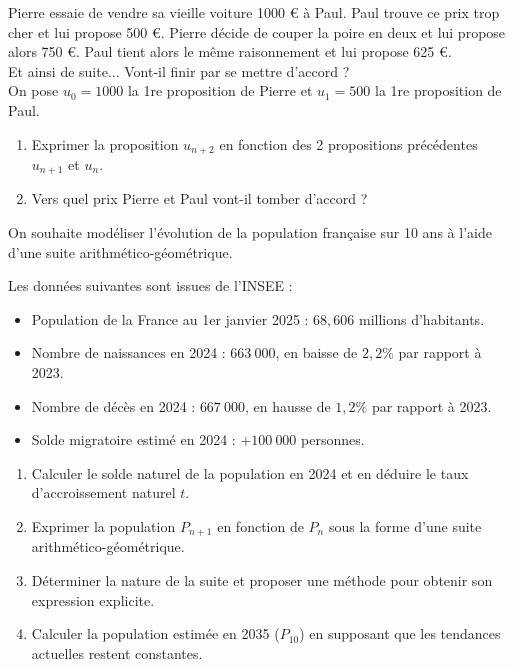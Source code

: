 \documentclass[11pt]{article}
\begin{document}
\begin{exercice}[6][Négociation]
Pierre essaie de vendre sa vieille voiture 1000 € à Paul. Paul trouve
ce prix trop cher et lui propose 500 €. Pierre décide de couper la
poire en deux et lui propose alors 750 €. Paul tient alors le même raisonnement et lui propose 625 €. \\
Et ainsi de suite... Vont-il finir par se mettre d’accord ? \\
On pose $u_0 = 1000$ la 1re proposition de Pierre et $u_1 = 500$ la
1re proposition de Paul.
\begin{enumerate}
\item Exprimer la proposition $u_{n+2}$ en fonction des 2 propositions précédentes $u_{n+1}$ et $u_n$.
\item Vers quel prix Pierre et Paul vont-il tomber d’accord ?
\end{enumerate}
\end{exercice}

\newpage

\begin{exercice}
On souhaite modéliser l'évolution de la population française sur 10
ans à l'aide d'une suite arithmético-géométrique.

Les données suivantes sont issues de l'INSEE :
\begin{itemize}
\item Population de la France au 1er janvier 2025 : $68{,}606$
millions d'habitants.
\item Nombre de naissances en 2024 : $663~000$, en baisse de $2{,}2\%$
par rapport à 2023.
\item Nombre de décès en 2024 : $667~000$, en hausse de $1{,}2\%$ par
rapport à 2023.
\item Solde migratoire estimé en 2024 : $+100~000$ personnes.
\end{itemize}

\begin{enumerate}
\item Calculer le solde naturel de la population en 2024 et en déduire
le taux d'accroissement naturel $t$.
\item Exprimer la population $P_{n+1}$ en fonction de $P_n$ sous la
forme d'une suite arithmético-géométrique.
\item Déterminer la nature de la suite et proposer une méthode pour
obtenir son expression explicite.
\item Calculer la population estimée en 2035 ($P_{10}$) en supposant
que les tendances actuelles restent constantes.
\end{enumerate}
\end{exercice}
\end{document}
